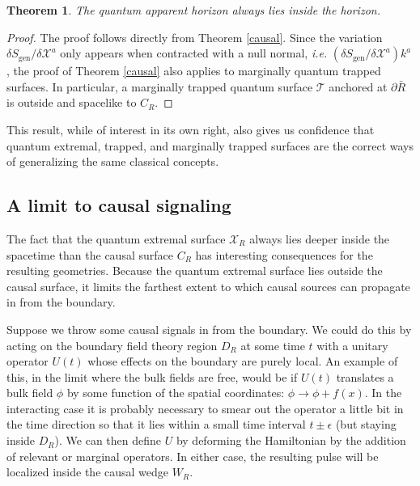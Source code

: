 \documentclass[12pt]{article}
\newtheorem{thm}{Theorem}[section]
\theoremstyle{remark}
\numberwithin{equation}{section}
\numberwithin{equation}{section}
\begin{document}
\begin{thm} The quantum apparent horizon always lies inside the horizon. \end{thm}

\begin{proof} The proof follows directly from Theorem \ref{causal}. Since the variation $\delta S_{\text{gen}}/\delta \mathcal{X}^{a}$ only appears when contracted with a null normal, \emph{i.e.} $\left(\delta S_{\text{gen}}/\delta \mathcal{X}^{a}\right) k^{a} $, the proof of Theorem \ref{causal} also applies to marginally quantum trapped surfaces. In particular, a marginally trapped quantum surface $\mathcal{T}$ anchored at $\partial \bar{ R}$ is outside and spacelike to $C_{R}$.\end{proof}

This result, while of interest in its own right, also gives us confidence that quantum extremal, trapped, and marginally trapped surfaces are the correct ways of generalizing the same classical concepts.




\subsection{A limit to causal signaling}

The fact that the quantum extremal surface $\mathcal{X}_{R}$ always lies deeper inside the spacetime than the causal surface $C_R$ has interesting consequences for the resulting geometries.  Because the quantum extremal surface lies outside the causal surface, it limits the farthest extent to which causal sources can propagate in from the boundary.

Suppose we throw some causal signals in from the boundary.  We could do this by acting on the boundary field theory region $D_R$ at some time $t$ with a unitary operator $U(t)$ whose effects on the boundary are purely local.  An example of this, in the limit where the bulk fields are free, would be if $U(t)$ translates a bulk field $\phi$ by some function of the spatial coordinates: $\phi \to \phi + f(x)$.  In the interacting case it is probably necessary to smear out the operator a little bit in the time direction so that it lies within a small time interval $t \pm \epsilon$ (but staying inside $D_R$).  We can then define $U$ by deforming the Hamiltonian by the addition of relevant or marginal operators.  In either case, the resulting pulse will be localized inside the causal wedge $W_R$.
\end{document}
